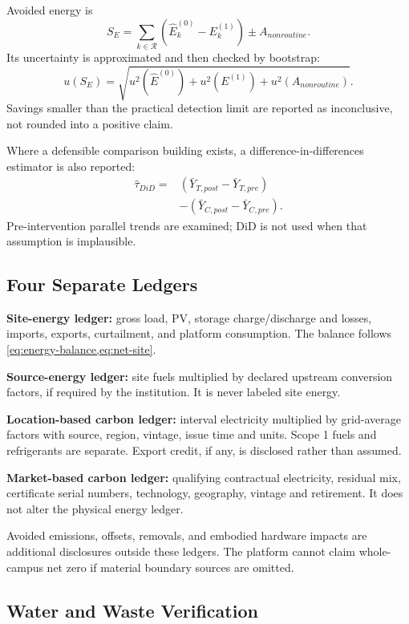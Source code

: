 Avoided energy is
\begin{equation}
	S_E=\sum_{k\in\mathcal R}(\hat E_k^{(0)}-E_k^{(1)})\pm A_{nonroutine}.
\end{equation}
Its uncertainty is approximated and then checked by bootstrap:
\begin{equation}
	u(S_E)=\sqrt{u^2(\hat E^{(0)})+u^2(E^{(1)})+u^2(A_{nonroutine})}.
\end{equation}
Savings smaller than the practical detection limit are reported as inconclusive, not rounded into a positive claim.

Where a defensible comparison building exists, a difference-in-differences estimator is also reported:
\begin{align}
	\hat\tau_{DiD}={} & (\bar Y_{T,post}-\bar Y_{T,pre})\nonumber \\
	                  & -(\bar Y_{C,post}-\bar Y_{C,pre}).
\end{align}
Pre-intervention parallel trends are examined; DiD is not used when that assumption is implausible.

\subsection{Four Separate Ledgers}

\textbf{Site-energy ledger:} gross load, PV, storage charge/discharge and losses, imports, exports, curtailment, and platform consumption. The balance follows \cref{eq:energy-balance,eq:net-site}.

\textbf{Source-energy ledger:} site fuels multiplied by declared upstream conversion factors, if required by the institution. It is never labeled site energy.

\textbf{Location-based carbon ledger:} interval electricity multiplied by grid-average factors with source, region, vintage, issue time and units. Scope 1 fuels and refrigerants are separate. Export credit, if any, is disclosed rather than assumed.

\textbf{Market-based carbon ledger:} qualifying contractual electricity, residual mix, certificate serial numbers, technology, geography, vintage and retirement. It does not alter the physical energy ledger.

Avoided emissions, offsets, removals, and embodied hardware impacts are additional disclosures outside these ledgers. The platform cannot claim whole-campus net zero if material boundary sources are omitted.

\subsection{Water and Waste Verification}

